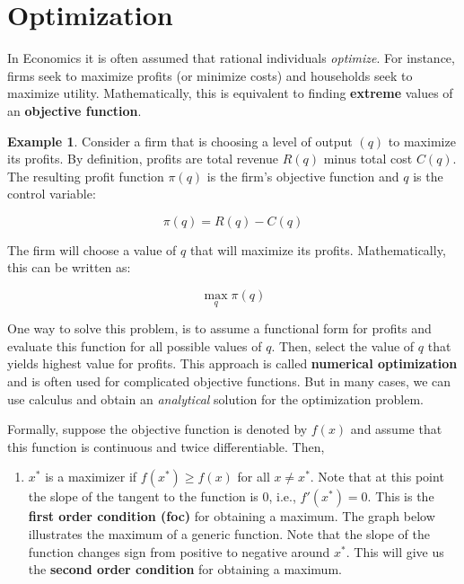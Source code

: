 \documentclass[
]{book}
\providecommand{\tightlist}{%
  \setlength{\itemsep}{0pt}\setlength{\parskip}{0pt}}
\theoremstyle{definition}
\theoremstyle{definition}
\newtheorem{example}{Example}[chapter]
\theoremstyle{definition}
\theoremstyle{definition}
\theoremstyle{remark}
\begin{document}
\hypertarget{optimization}{%
\section{Optimization}\label{optimization}}

In Economics it is often assumed that rational individuals \emph{optimize}. For instance, firms seek to maximize profits (or minimize costs) and households seek to maximize utility. Mathematically, this is equivalent to finding \textbf{extreme} values of an \textbf{objective function}.

\begin{example}
\protect\hypertarget{exm:unnamed-chunk-10}{}\label{exm:unnamed-chunk-10}Consider a firm that is choosing a level of output \((q)\) to maximize its profits. By definition, profits are total revenue \(R(q)\) minus total cost \(C(q)\). The resulting profit function \(\pi(q)\) is the firm's objective function and \(q\) is the control variable:

\[\pi(q)=R(q)- C(q)\]

The firm will choose a value of \(q\) that will maximize its profits. Mathematically, this can be written as:

\[ \max_{q} \pi(q)\]
\end{example}

One way to solve this problem, is to assume a functional form for profits and evaluate this function for all possible values of \(q\). Then, select the value of \(q\) that yields highest value for profits. This approach is called \textbf{numerical optimization} and is often used for complicated objective functions. But in many cases, we can use calculus and obtain an \emph{analytical} solution for the optimization problem.

Formally, suppose the objective function is denoted by \(f(x)\) and assume that this function is continuous and twice differentiable. Then,

\begin{enumerate}
\def\labelenumi{\arabic{enumi}.}
\tightlist
\item
  \(x^*\) is a maximizer if \(f(x^*)\geq f(x)\) for all \(x\neq x^*\). Note that at this point the slope of the tangent to the function is \(0\), i.e., \(f'(x^*)=0\). This is the \textbf{first order condition (foc)} for obtaining a maximum. The graph below illustrates the maximum of a generic function. Note that the slope of the function changes sign from positive to negative around \(x^*\). This will give us the \textbf{second order condition} for obtaining a maximum.
\end{enumerate}
\end{document}
